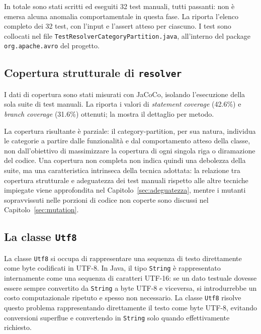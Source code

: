 In totale sono stati scritti ed eseguiti 32 test manuali, tutti
passanti: non è emersa alcuna anomalia comportamentale in questa fase.
La  riporta l'elenco completo dei 32
test, con l'input e l'assert atteso per ciascuno. I test sono
collocati nel file \texttt{TestResolverCategoryPartition.java},
all'interno del package \texttt{org.apache.avro} del progetto.


\subsection{Copertura strutturale di \texttt{resolver}}

I dati di copertura sono stati misurati con JaCoCo, isolando
l'esecuzione della sola suite di test manuali. La
 riporta i valori di \emph{statement coverage}
(42.6\%) e \emph{branch coverage} (31.6\%) ottenuti; la
 mostra il dettaglio per metodo.

La copertura risultante è parziale: il category-partition, per sua
natura, individua le categorie a partire dalle funzionalità e dal
comportamento atteso della classe, non dall'obiettivo di massimizzare
la copertura di ogni singola riga o diramazione del codice. Una
copertura non completa non indica quindi una debolezza della suite, ma
una caratteristica intrinseca della tecnica adottata: la relazione tra
copertura strutturale e adeguatezza dei test manuali rispetto alle
altre tecniche impiegate viene approfondita nel
Capitolo~\ref{sec:adeguatezza}, mentre i mutanti sopravvissuti nelle
porzioni di codice non coperte sono discussi nel
Capitolo~\ref{sec:mutation}.

\subsection{La classe \texttt{Utf8}}

La classe \texttt{Utf8} si occupa di rappresentare una sequenza di
testo direttamente come byte codificati in UTF-8. In Java, il tipo
\texttt{String} è rappresentato internamente come una sequenza di
caratteri UTF-16: se un dato testuale dovesse essere sempre convertito
da \texttt{String} a byte UTF-8 e viceversa, si introdurrebbe un costo
computazionale ripetuto e spesso non necessario. La classe \texttt{Utf8}
risolve questo problema rappresentando direttamente il testo come byte
UTF-8, evitando conversioni superflue e convertendo in \texttt{String}
solo quando effettivamente richiesto.

